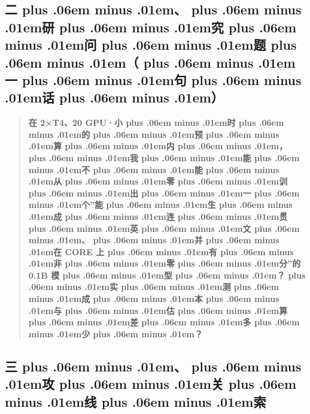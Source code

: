 \documentclass[
]{article}
\def\zh#1{{\zhfont #1}}
\def\sym#1{{\symfont #1}}
\def\zhglue{\hskip0pt plus .06em minus .01em}
\begin{document}
\subsection{\zh{二\zhglue 、\zhglue 研\zhglue 究\zhglue 问\zhglue 题\zhglue （\zhglue 一\zhglue 句\zhglue 话\zhglue ）}}\label{ux4e8cux7814ux7a76ux95eeux9898ux4e00ux53e5ux8bdd-2}

\begin{quote}
\textbf{\zh{在} 2\sym{×}T4\zh{、}20 GPU\sym{·}\zh{小\zhglue 时\zhglue 的\zhglue 预\zhglue 算\zhglue 内\zhglue ，\zhglue 我\zhglue 能\zhglue 不\zhglue 能\zhglue 从\zhglue 零\zhglue 训\zhglue 出\zhglue 一\zhglue 个}''\zh{能\zhglue 生\zhglue 成\zhglue 连\zhglue 贯\zhglue 英\zhglue 文\zhglue 、\zhglue 并\zhglue 在} CORE \zh{上\zhglue 有\zhglue 非\zhglue 零\zhglue 分}''\zh{的} 0.1B \zh{模\zhglue 型\zhglue ？\zhglue 实\zhglue 测\zhglue 成\zhglue 本\zhglue 与\zhglue 估\zhglue 算\zhglue 差\zhglue 多\zhglue 少\zhglue ？}}
\end{quote}

\subsection{\zh{三\zhglue 、\zhglue 攻\zhglue 关\zhglue 线\zhglue 索}}\label{ux4e09ux653bux5173ux7ebfux7d22-2}
\end{document}
